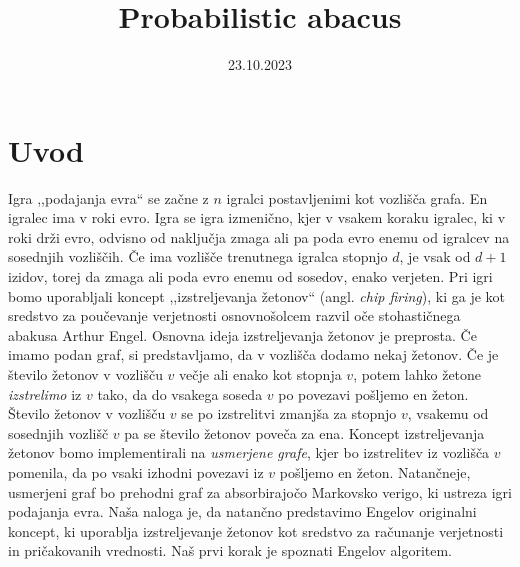 \documentclass[twoside,11pt]{article}
\begin{document}



\date{23.10.2023}

\klasifikacija{~} 
\title{Probabilistic abacus}

\glava
\baselineskip=14.5pt

\smallskip

\section{Uvod}
Igra ,,podajanja evra`` se začne z $n$ igralci postavljenimi kot vozlišča grafa. En igralec ima v roki evro. Igra se igra izmenično, kjer v vsakem koraku igralec, ki v roki drži evro, odvisno od naključja zmaga ali pa poda evro enemu od igralcev na sosednjih vozliščih. Če ima vozlišče trenutnega igralca stopnjo $d$, je vsak od $d + 1$ izidov, torej da zmaga ali poda evro enemu od sosedov, enako verjeten. Pri igri bomo uporabljali koncept ,,izstreljevanja žetonov`` (angl. \emph{chip firing}), ki ga je kot sredstvo za poučevanje verjetnosti osnovnošolcem razvil oče stohastičnega abakusa Arthur Engel.
Osnovna ideja izstreljevanja žetonov je preprosta. Če imamo podan graf, si predstavljamo, da v vozlišča dodamo nekaj žetonov. Če je število žetonov v vozlišču $v$ večje ali enako kot stopnja $v$, potem lahko žetone \emph{izstrelimo} iz $v$ tako, da do vsakega soseda $v$ po povezavi pošljemo en žeton. Število žetonov v vozlišču $v$ se po izstrelitvi zmanjša za stopnjo $v$, vsakemu od sosednjih vozlišč $v$ pa se število žetonov poveča za ena. 
Koncept izstreljevanja žetonov bomo implementirali na \emph{usmerjene grafe}, kjer bo izstrelitev iz vozlišča $v$ pomenila, da po vsaki izhodni povezavi iz $v$ pošljemo en žeton. Natančneje, usmerjeni graf bo prehodni graf za absorbirajočo Markovsko verigo, ki ustreza igri podajanja evra. Naša naloga je, da natančno predstavimo Engelov originalni koncept, ki uporablja izstreljevanje žetonov kot sredstvo za računanje verjetnosti in pričakovanih vrednosti. Naš prvi korak je spoznati Engelov algoritem.
\end{document}
